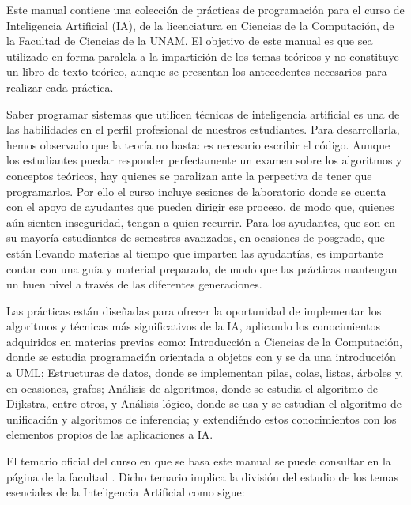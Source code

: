 
Este manual contiene una colección de prácticas de programación para el curso de Inteligencia Artificial (IA), de la licenciatura en Ciencias de la Computación, de la Facultad de Ciencias de la UNAM.  El objetivo de este manual es que sea utilizado en forma paralela a la impartición de los temas teóricos y no constituye un libro de texto teórico, aunque se presentan los antecedentes necesarios para realizar cada práctica.

Saber programar sistemas que utilicen técnicas de inteligencia artificial es una de las habilidades en el perfil profesional de nuestros estudiantes.  Para desarrollarla, hemos observado que la teoría no basta: es necesario escribir el código.  Aunque los estudiantes puedar responder perfectamente un examen sobre los algoritmos y conceptos teóricos, hay quienes se paralizan ante la perpectiva de tener que programarlos.  Por ello el curso incluye sesiones de laboratorio donde se cuenta con el apoyo de ayudantes que pueden dirigir ese proceso, de modo que, quienes aún sienten inseguridad, tengan a quien recurrir.  Para los ayudantes, que son en su mayoría estudiantes de semestres avanzados, en ocasiones de posgrado, que están llevando materias al tiempo que imparten las ayudantías, es importante contar con una guía y material preparado, de modo que las prácticas mantengan un buen nivel a través de las diferentes generaciones.

Las prácticas están diseñadas para ofrecer la oportunidad de implementar los algoritmos y técnicas más significativos de la IA, aplicando los conocimientos adquiridos en materias previas como: Introducción a Ciencias de la Computación, donde se estudia programación orientada a objetos con \Java y se da una introducción a UML; Estructuras de datos, donde se implementan pilas, colas, listas, árboles y, en ocasiones, grafos; Análisis de algoritmos, donde se estudia el algoritmo de Dijkstra, entre otros, y Análisis lógico, donde se usa  y se estudian el algoritmo de unificación y algoritmos de inferencia; y extendiéndo estos conocimientos con los elementos propios de las aplicaciones a IA.

El temario oficial del curso en que se basa este manual se puede consultar en la página de la facultad .  Dicho temario implica la división del estudio de los temas esenciales de la Inteligencia Artificial como sigue:

